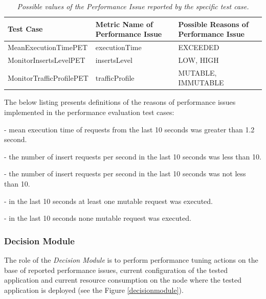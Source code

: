\documentclass[12pt,a4paper]{article}
\let\tempone\itemize
\let\temptwo\enditemize
\renewenvironment{itemize}{\tempone\addtolength{\itemsep}{-0.4\baselineskip}}{\temptwo}
\begin{document}
\begin{table}[!htb]
\begin{center}
\begin{tabularx}{\textwidth}{l|p{4cm}|X}
\textbf{Test Case} & \textbf{Metric Name of Performance Issue} & \textbf{Possible Reasons of Performance Issue} \\ \hline
MeanExecutionTimePET & executionTime & EXCEEDED \\\hline
MonitorInsertsLevelPET & insertsLevel &LOW, HIGH \\\hline
MonitorTrafficProfilePET & trafficProfile & MUTABLE, IMMUTABLE \\
\end{tabularx}
\end{center}
\caption{\textit{Possible values of the Performance Issue reported by the specific test case.}}\label{testcasescomp}
\end{table}

The below listing presents definitions of the reasons of performance issues implemented in the performance evaluation test cases:
\begin{itemize}
\item[EXCEEDED (executionTime)] - mean execution time of requests from the last 10 seconds was greater than 1.2 second. 
\item[LOW (insertsLevel)] - the number of insert requests per second in the last 10 seconds was  less than 10. 
\item[HIGH (insertsLevel)] - the number of insert requests per second in the last 10 seconds was not less than 10.
\item[MUTABLE (trafficProfile)] - in the last 10 seconds at least one mutable request was executed.
\item[IMMUTABLE (trafficProfile)] - in the last 10 seconds none mutable request was executed.
\end{itemize}

\subsubsection{Decision Module} \label{dm}

The role of the \textit{Decision Module} is to perform performance tuning actions on the base of reported performance issues, current configuration of the tested application and current resource consumption on the node where the tested application is deployed (see the Figure \ref{decisionmodule}). 
\end{document}
